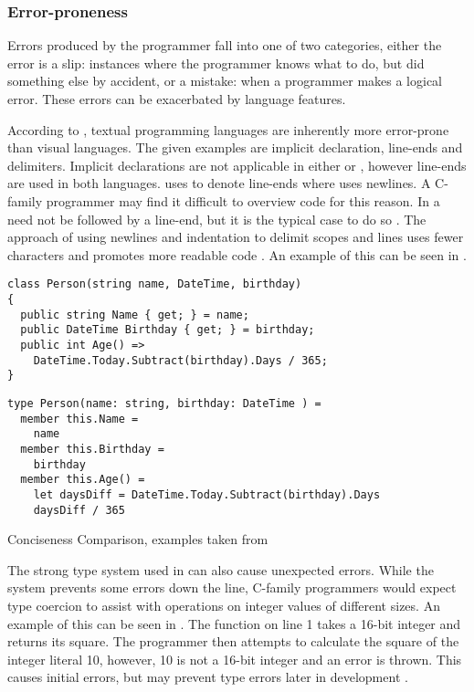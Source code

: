 \subsubsection{Error-proneness}
Errors produced by the programmer fall into one of two categories, either the error is a slip: instances where the programmer knows what to do, but did something else by accident, or a mistake: when a programmer makes a logical error. These errors can be exacerbated by language features.

According to \cite{green1996usability}, textual programming languages are inherently more error-prone than visual languages. The given examples are implicit declaration, line-ends and delimiters. Implicit declarations are not applicable in either \cs or \fs, however line-ends are used in both languages. \cs uses \m{;} to denote line-ends where \fs uses newlines. A C-family programmer may find it difficult to overview \fs code for this reason. In \cs a \m{;} need not be followed by a line-end, but it is the typical case to do so \needcite. The \fs approach of using newlines and indentation to delimit scopes and lines uses fewer characters and promotes more readable code \needcite{}. An example of this can be seen in .

\begin{listing}[H]
\begin{verbatim}
class Person(string name, DateTime, birthday)
{
  public string Name { get; } = name;
  public DateTime Birthday { get; } = birthday;
  public int Age() =>
    DateTime.Today.Subtract(birthday).Days / 365;
}
\end{verbatim}
\begin{verbatim}
type Person(name: string, birthday: DateTime ) =
  member this.Name =
    name
  member this.Birthday =
    birthday
  member this.Age() =
    let daysDiff = DateTime.Today.Subtract(birthday).Days
    daysDiff / 365
\end{verbatim}
\caption{Conciseness Comparison, examples taken from \cite{wlaschin2017FsharpForCsharpProgrammers}}
\label{lst:con-comp}
\end{listing}

The strong type system used in \fs can also cause unexpected errors. While the system prevents some errors down the line, C-family programmers would expect type coercion to assist with operations on integer values of different sizes. An example of this can be seen in . The function on line 1 takes a 16-bit integer and returns its square. The programmer then attempts to calculate the square of the integer literal 10, however, 10 is not a 16-bit integer and an error is thrown. This causes initial errors, but may prevent type errors later in development \needcite.

